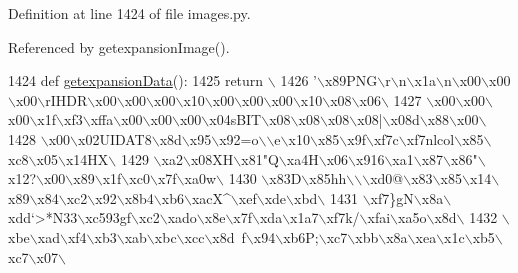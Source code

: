 Definition at line 1424 of file images.\+py.



Referenced by getexpansion\+Image().


\begin{DoxyCode}
1424 \textcolor{keyword}{def }\hyperlink{namespaceimages_ac8cc40b8acd6eebb42a77ab79cc39b24}{getexpansionData}():
1425     \textcolor{keywordflow}{return} \(\backslash\)
1426 \textcolor{stringliteral}{'\(\backslash\)x89PNG\(\backslash\)r\(\backslash\)n\(\backslash\)x1a\(\backslash\)n\(\backslash\)x00\(\backslash\)x00\(\backslash\)x00\(\backslash\)rIHDR\(\backslash\)x00\(\backslash\)x00\(\backslash\)x00\(\backslash\)x10\(\backslash\)x00\(\backslash\)x00\(\backslash\)x00\(\backslash\)x10\(\backslash\)x08\(\backslash\)x06\(\backslash\)}
1427 \textcolor{stringliteral}{\(\backslash\)x00\(\backslash\)x00\(\backslash\)x00\(\backslash\)x1f\(\backslash\)xf3\(\backslash\)xffa\(\backslash\)x00\(\backslash\)x00\(\backslash\)x00\(\backslash\)x04sBIT\(\backslash\)x08\(\backslash\)x08\(\backslash\)x08\(\backslash\)x08|\(\backslash\)x08d\(\backslash\)x88\(\backslash\)x00\(\backslash\)}
1428 \textcolor{stringliteral}{\(\backslash\)x00\(\backslash\)x02UIDAT8\(\backslash\)x8d\(\backslash\)x95\(\backslash\)x92=o\(\backslash\)\(\backslash\)e\(\backslash\)x10\(\backslash\)x85\(\backslash\)x9f\(\backslash\)xf7c\(\backslash\)xf7nlcol\(\backslash\)x85\(\backslash\)xc8\(\backslash\)x05\(\backslash\)x14HX\(\backslash\)}
1429 \textcolor{stringliteral}{\(\backslash\)xa2\(\backslash\)x08XH\(\backslash\)x81"Q\(\backslash\)xa4H\(\backslash\)x06\(\backslash\)x916\(\backslash\)xa1\(\backslash\)x87\(\backslash\)x86"\(\backslash\)x12?\(\backslash\)x00\(\backslash\)x89\(\backslash\)x1f\(\backslash\)xc0\(\backslash\)x7f\(\backslash\)xa0w\(\backslash\)}
1430 \textcolor{stringliteral}{\(\backslash\)x83D\(\backslash\)x85hh\(\backslash\)\(\backslash\)\(\backslash\)xd0@\(\backslash\)x83\(\backslash\)x85\(\backslash\)x14\(\backslash\)x89\(\backslash\)x84\(\backslash\)xc2\(\backslash\)x92\(\backslash\)x8b4\(\backslash\)xb6\(\backslash\)xacX^\(\backslash\)xef\(\backslash\)xde\(\backslash\)xbd\(\backslash\)}
1431 \textcolor{stringliteral}{\(\backslash\)xf7\}gN\(\backslash\)x8a\(\backslash\)xdd`>*N33\(\backslash\)xc593gf\(\backslash\)xc2\(\backslash\)xado\(\backslash\)x8e\(\backslash\)x7f\(\backslash\)xda\(\backslash\)x1a7\(\backslash\)xf7k/\(\backslash\)xfai\(\backslash\)xa5o\(\backslash\)x8d\(\backslash\)}
1432 \textcolor{stringliteral}{\(\backslash\)xbe\(\backslash\)xad\(\backslash\)xf4\(\backslash\)xb3\(\backslash\)xab\(\backslash\)xbc\(\backslash\)xcc\(\backslash\)x8d~f\(\backslash\)x94\(\backslash\)xb6P;\(\backslash\)xc7\(\backslash\)xbb\(\backslash\)x8a\(\backslash\)xea\(\backslash\)x1c\(\backslash\)xb5\(\backslash\)xc7\(\backslash\)x07\(\backslash\)}

\end{DoxyCode}
